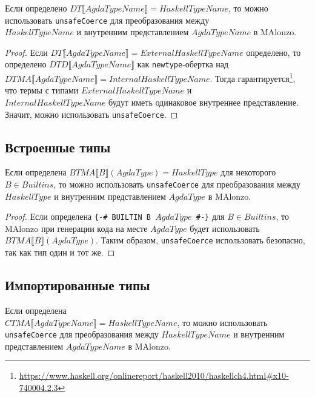 \begin{thm}\label{thm:exported-types}
Если определено \(DT\llbracket AgdaTypeName \rrbracket = HaskellTypeName\), то
можно использовать \texttt{unsafeCoerce} для преобразования между\\
\(HaskellTypeName\) и внутренним представлением \(AgdaTypeName\) в MAlonzo.
\end{thm}

\begin{proof}
Если \(DT\llbracket AgdaTypeName \rrbracket = ExternalHaskellTypeName\) определено,
то определено \(DTD\llbracket AgdaTypeName \rrbracket\) как \texttt{newtype}-обертка
над \(DTMA\llbracket AgdaTypeName \rrbracket = InternalHaskellTypeName\).
Тогда гарантируется\footnote{
\url{https://www.haskell.org/onlinereport/haskell2010/haskellch4.html\#x10-740004.2.3}},
что термы с типами \(ExternalHaskellTypeName\) и \\\(InternalHaskellTypeName\) будут иметь
одинаковое внутреннее представление. Значит, можно использовать \texttt{unsafeCoerce}.
\end{proof}

\subsection{Встроенные типы}

\begin{thm}\label{thm:builtin-types}
Если определена \(BTMA\llbracket B \rrbracket(AgdaType) = HaskellType\) для
некоторого \(B \in Builtins\), то можно использовать \texttt{unsafeCoerce}
для преобразования между \(HaskellType\) и внутренним представлением \(AgdaType\) в
MAlonzo.
\end{thm}

\begin{proof}
Если определена \texttt{\{-\# BUILTIN B \(AgdaType\) \#-\}} для \(B \in Builtins\),
то MAlonzo при генерации кода на месте \(AgdaType\) будет использовать
\(BTMA\llbracket B \rrbracket(AgdaType)\). Таким образом, \texttt{unsafeCoerce}
использовать безопасно, так как тип один и тот же.
\end{proof}

\subsection{Импортированные типы}

\begin{thm}\label{thm:imported-types}
Если определена\\ \(CTMA\llbracket AgdaTypeName \rrbracket = HaskellTypeName\), то
можно использовать \texttt{unsafeCoerce} для преобразования между
\(HaskellTypeName\) и внутренним представлением \(AgdaTypeName\) в MAlonzo.
\end{thm}

